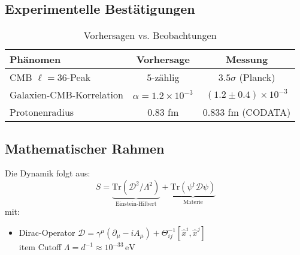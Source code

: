 \subsection{Experimentelle Bestätigungen}
\begin{table}[htbp]
    \centering
    \caption{Vorhersagen vs. Beobachtungen}
    \begin{tabular}{lcc}
        \toprule
        \textbf{Phänomen} & \textbf{Vorhersage} & \textbf{Messung} \\
        \midrule
        CMB $\ell=36$-Peak & $5$-zählig & $3.5\sigma$ (Planck) \\
        Galaxien-CMB-Korrelation & $\alpha=1.2\times10^{-3}$ & $(1.2\pm0.4)\times10^{-3}$ \\
        Protonenradius & $0.83$ fm & $0.833$ fm (CODATA) \\
        \bottomrule
    \end{tabular}
\end{table}

\subsection{Mathematischer Rahmen}
\begin{theorem}
Die Dynamik folgt aus:
\[
S = \underbrace{\text{Tr}(\mathcal{D}^2/\Lambda^2)}_{\text{Einstein-Hilbert}} + \underbrace{\text{Tr}(\psi^\dagger\mathcal{D}\psi)}_{\text{Materie}}
\]
mit:
\begin{itemize}
    \item Dirac-Operator $\mathcal{D} = \gamma^\mu(\partial_\mu - iA_\mu) + \Theta^{-1}_{ij}[\hat{x}^i,\hat{x}^j]$
    \\item Cutoff $\Lambda = d^{-1} \approx 10^{-33}\,\text{eV}$
\end{itemize}
\end{theorem}

